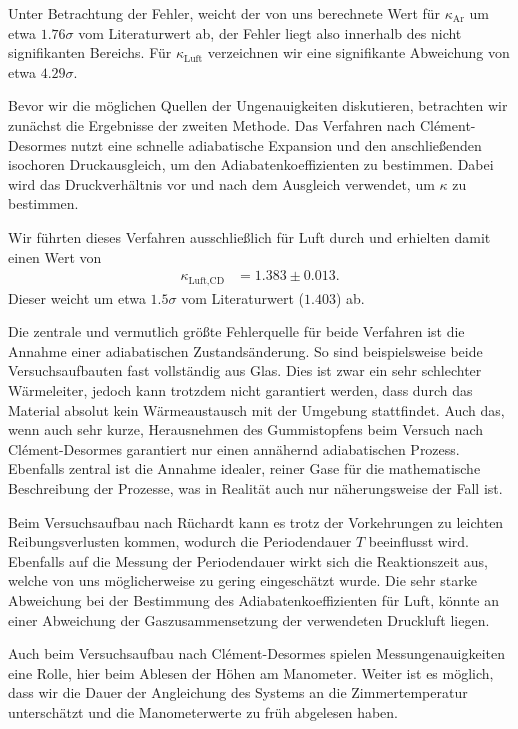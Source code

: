 Unter Betrachtung der Fehler, weicht der von uns berechnete Wert für $\kappa_{\text{Ar}}$ um etwa $1.76\sigma$ vom Literaturwert ab, der Fehler liegt also innerhalb des nicht signifikanten Bereichs. Für $\kappa_{\text{Luft}}$ verzeichnen wir eine signifikante Abweichung von etwa $4.29\sigma$.

Bevor wir die möglichen Quellen der Ungenauigkeiten diskutieren, betrachten wir zunächst die Ergebnisse der zweiten Methode. Das Verfahren nach Clément-Desormes nutzt eine schnelle adiabatische Expansion und den anschließenden isochoren Druckausgleich, um den Adiabatenkoeffizienten zu bestimmen. Dabei wird das Druckverhältnis vor und nach dem Ausgleich verwendet, um $\kappa$ zu bestimmen.

Wir führten dieses Verfahren ausschließlich für Luft durch und erhielten damit einen Wert von
\begin{align}
  \kappa_{\text{Luft,CD}} &= 1.383 \pm 0.013.
\end{align}
Dieser weicht um etwa $1.5\sigma$ vom Literaturwert ($1.403$) ab.

Die zentrale und vermutlich größte Fehlerquelle für beide Verfahren ist die Annahme einer adiabatischen Zustandsänderung. So sind beispielsweise beide Versuchsaufbauten fast vollständig aus Glas. Dies ist zwar ein sehr schlechter Wärmeleiter, jedoch kann trotzdem nicht garantiert werden, dass durch das Material absolut kein Wärmeaustausch mit der Umgebung stattfindet. Auch das, wenn auch sehr kurze, Herausnehmen des Gummistopfens beim Versuch nach Clément-Desormes garantiert nur einen annähernd adiabatischen Prozess. Ebenfalls zentral ist die Annahme idealer, reiner Gase für die mathematische Beschreibung der Prozesse, was in Realität auch nur näherungsweise der Fall ist.

Beim Versuchsaufbau nach Rüchardt kann es trotz der Vorkehrungen zu leichten Reibungsverlusten kommen, wodurch die Periodendauer $T$ beeinflusst wird. Ebenfalls auf die Messung der Periodendauer wirkt sich die Reaktionszeit aus, welche von uns möglicherweise zu gering eingeschätzt wurde. Die sehr starke Abweichung bei der Bestimmung des Adiabatenkoeffizienten für Luft, könnte an einer Abweichung der Gaszusammensetzung der verwendeten Druckluft liegen.

Auch beim Versuchsaufbau nach Clément-Desormes spielen Messungenauigkeiten eine Rolle, hier beim Ablesen der Höhen am Manometer. Weiter ist es möglich, dass wir die Dauer der Angleichung des Systems an die Zimmertemperatur unterschätzt und die Manometerwerte zu früh abgelesen haben.